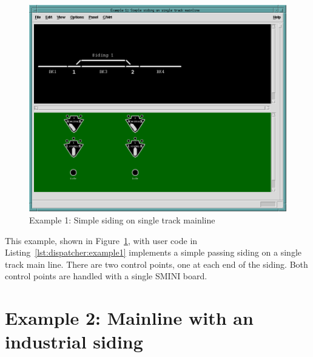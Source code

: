 \begin{figure}[hbpt]
\begin{centering}
\includegraphics[width=5in]{DISPExample1.png}
\caption{Example 1: Simple siding on single track mainline}
\label{fig:dispatcher:example1}
\end{centering}
\end{figure}


This example, shown in Figure~\ref{fig:dispatcher:example1}, with user
code in Listing~\ref{lst:dispatcher:example1} implements a simple
passing siding on a single track main line.  There are two control
points, one at each end of the siding.  Both control points are handled
with a single SMINI board.

\section{Example 2: Mainline with an industrial siding}

